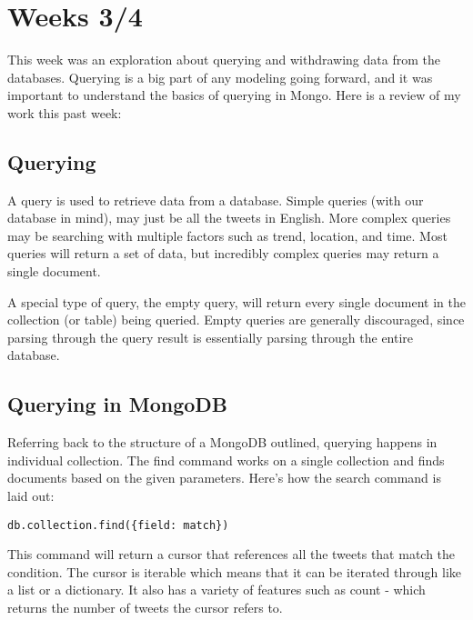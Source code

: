 \documentclass[11pt, twoside, reqno]{article}
\begin{document}
\section{Weeks 3/4}

This week was an exploration about querying and withdrawing data from the databases. Querying is a big part of any modeling going forward, and it was important to understand the basics of querying in Mongo. Here is a review of my work this past week:

\subsection{Querying}
A query is used to retrieve data from a database. Simple queries (with our database in mind), may just be all the tweets in English. More complex queries may be searching with multiple factors such as trend, location, and time. Most queries will return a set of data, but incredibly complex queries may return a single document. 

A special type of query, the empty query, will return every single document in the collection (or table) being queried. Empty queries are generally discouraged, since parsing through the query result is essentially parsing through the entire database. 


\subsection{Querying in MongoDB}
Referring back to the structure of a MongoDB outlined, querying happens in individual collection. The find command works on a single collection and finds documents based on the given parameters. Here's how the search command is laid out:

\begin{lstlisting}
db.collection.find({field: match})
\end{lstlisting}

This command will return a cursor that references all the tweets that match the condition. The cursor is iterable which means that it can be iterated through like a list or a dictionary. It also has a variety of features such as count - which returns the number of tweets the cursor refers to. 
\end{document}
